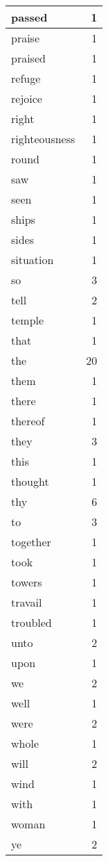\begin{center}
\begin{longtable}{l|r}
passed & 1 \\ \hline
praise & 1 \\ \hline
praised & 1 \\ \hline
refuge & 1 \\ \hline
rejoice & 1 \\ \hline
right & 1 \\ \hline
righteousness & 1 \\ \hline
round & 1 \\ \hline
saw & 1 \\ \hline
seen & 1 \\ \hline
ships & 1 \\ \hline
sides & 1 \\ \hline
situation & 1 \\ \hline
so & 3 \\ \hline
tell & 2 \\ \hline
temple & 1 \\ \hline
that & 1 \\ \hline
the & 20 \\ \hline
them & 1 \\ \hline
there & 1 \\ \hline
thereof & 1 \\ \hline
they & 3 \\ \hline
this & 1 \\ \hline
thought & 1 \\ \hline
thy & 6 \\ \hline
to & 3 \\ \hline
together & 1 \\ \hline
took & 1 \\ \hline
towers & 1 \\ \hline
travail & 1 \\ \hline
troubled & 1 \\ \hline
unto & 2 \\ \hline
upon & 1 \\ \hline
we & 2 \\ \hline
well & 1 \\ \hline
were & 2 \\ \hline
whole & 1 \\ \hline
will & 2 \\ \hline
wind & 1 \\ \hline
with & 1 \\ \hline
woman & 1 \\ \hline
ye & 2 \\ \hline
\end{longtable}
\end{center}



